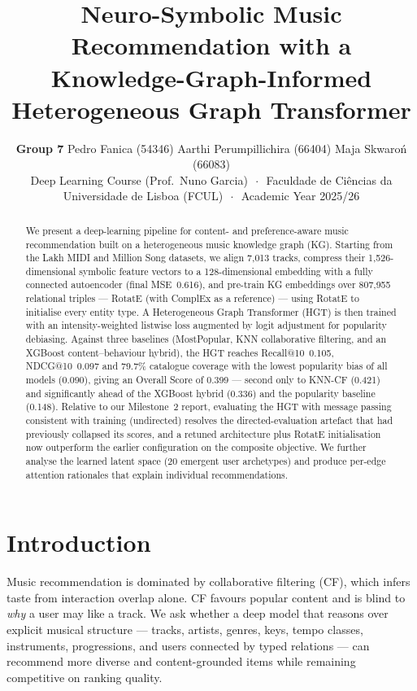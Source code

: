\documentclass[10pt,twocolumn,letterpaper]{article}
\title{Neuro-Symbolic Music Recommendation with a\\
Knowledge-Graph-Informed Heterogeneous Graph Transformer}
\author{%
  \textbf{Group 7} \quad
  Pedro Fanica (54346) \quad
  Aarthi Perumpillichira (66404) \quad
  Maja Skwaro\'n (66083)\\[0.25em]
  {\small Deep Learning Course (Prof.\ Nuno Garcia)
    $\,\cdot\,$
    Faculdade de Ci\^encias da Universidade de Lisboa (FCUL)
    $\,\cdot\,$
    Academic Year 2025/26}%
}
\begin{document}
\maketitle
\thispagestyle{plain}  %

\begin{abstract}
We present a deep-learning pipeline for content- and preference-aware music
recommendation built on a heterogeneous music knowledge graph (KG). Starting from
the Lakh MIDI and Million Song datasets, we align 7{,}013 tracks, compress their
1{,}526-dimensional symbolic feature vectors to a 128-dimensional embedding with a
fully connected autoencoder (final MSE~0.616), and pre-train KG embeddings over
807{,}955 relational triples --- RotatE (with ComplEx as a reference) --- using
RotatE to initialise every entity type. A Heterogeneous Graph Transformer (HGT) is then trained with an
intensity-weighted listwise loss augmented by logit adjustment for popularity
debiasing. Against three baselines (MostPopular, KNN collaborative filtering, and
an XGBoost content--behaviour hybrid), the HGT reaches Recall@10~0.105,
NDCG@10~0.097 and 79.7\% catalogue coverage with the lowest popularity bias of all
models (0.090), giving an Overall Score of 0.399 --- second only to KNN-CF (0.421)
and significantly ahead of the XGBoost hybrid (0.336) and the popularity baseline
(0.148). Relative to our Milestone~2 report, evaluating the HGT with message
passing consistent with training (undirected) resolves the directed-evaluation
artefact that had previously collapsed its scores, and a retuned architecture plus
RotatE initialisation now outperform the earlier configuration on the composite
objective. We further analyse
the learned latent space (20 emergent user archetypes) and produce per-edge
attention rationales that explain individual recommendations.
\end{abstract}

\section{Introduction}
\label{sec:intro}

Music recommendation is dominated by collaborative filtering (CF), which infers
taste from interaction overlap alone. CF favours popular content and is blind to
\emph{why} a user may like a track. We ask whether a deep model that reasons over explicit
musical structure --- tracks, artists, genres, keys, tempo classes, instruments, progressions,
and users connected by typed relations --- can recommend more diverse and
content-grounded items while remaining competitive on ranking quality.
\end{document}
